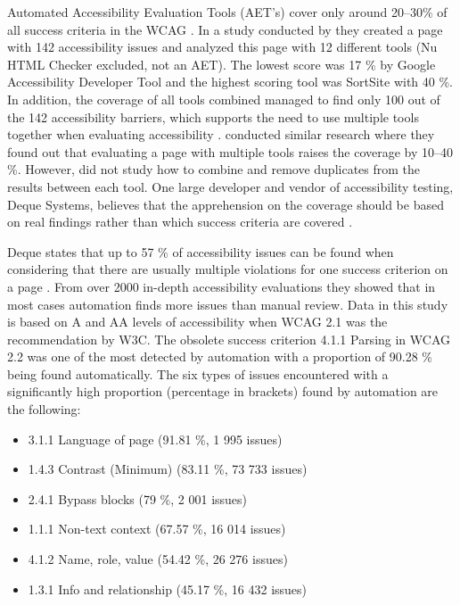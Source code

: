 Automated Accessibility Evaluation Tools (AET's) cover only around 20--30\% of all success criteria in the WCAG \citep{govukaccessibilityresults, dequecoverage, webaimmillions}. In a study conducted by \textcite{govukaccessibilityresults} they created a page with 142 accessibility issues and analyzed this page with 12 different tools (Nu HTML Checker excluded, not an AET). The lowest score was 17 \% by Google Accessibility Developer Tool and the highest scoring tool was SortSite with 40 \%. In addition, the coverage of all tools combined managed to find only 100 out of the 142 accessibility barriers, which supports the need to use multiple tools together when evaluating accessibility \citep{govukaccessibilityresults_blog}. \textcite{comparison_10.1145/3371300.3383346} conducted similar research where they found out that evaluating a page with multiple tools raises the coverage by 10--40 \%. However, \textcite{comparison_10.1145/3371300.3383346} did not study how to combine and remove duplicates from the results between each tool. One large developer and vendor of accessibility testing, Deque Systems, believes that the apprehension on the coverage should be based on real findings rather than which success criteria are covered \citep{dequecoverage}. 

Deque states that up to 57 \% of accessibility issues can be found when considering that there are usually multiple violations for one success criterion on a page \citep{dequecoverage}. From over 2000 in-depth accessibility evaluations they showed that in most cases automation finds more issues than manual review. Data in this study is based on A and AA levels of accessibility when WCAG 2.1 was the recommendation by W3C. The obsolete success criterion 4.1.1 Parsing in WCAG 2.2 was one of the most detected by automation with a proportion of 90.28 \% being found automatically. The six types of issues encountered with a significantly high proportion (percentage in brackets) found by automation are the following: 

\begin{itemize}
  \item 3.1.1 Language of page (91.81 \%, 1 995 issues)
  \item 1.4.3 Contrast (Minimum) (83.11 \%, 73 733 issues)
  \item 2.4.1 Bypass blocks (79 \%, 2 001 issues)
  \item 1.1.1 Non-text context (67.57 \%, 16 014 issues)
  \item 4.1.2 Name, role, value (54.42 \%, 26 276 issues)
  \item 1.3.1 Info and relationship (45.17 \%, 16 432 issues)
\end{itemize}

